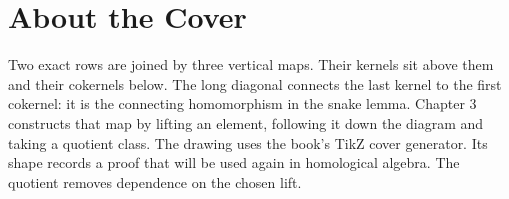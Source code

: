 \backmatter
\cleardoublepage
\chapter*{About the Cover}
\noindent Two exact rows are joined by three vertical maps. Their kernels sit above them and their cokernels below. The long diagonal connects the last kernel to the first cokernel: it is the connecting homomorphism in the snake lemma. Chapter 3 constructs that map by lifting an element, following it down the diagram and taking a quotient class. The drawing uses the book's TikZ cover generator. Its shape records a proof that will be used again in homological algebra. The quotient removes dependence on the chosen lift.
